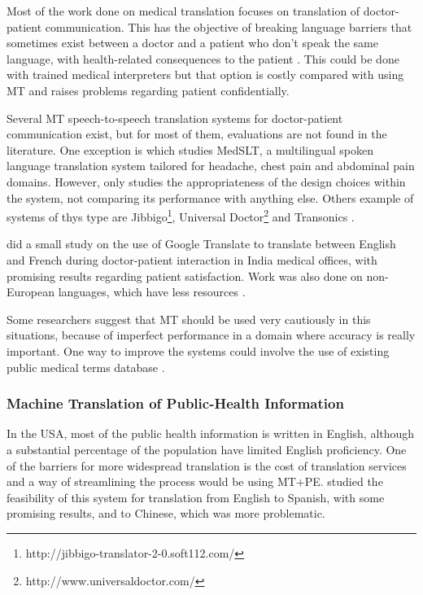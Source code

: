 Most of the work done on medical translation focuses on translation of doctor-patient communication. This has the objective of breaking language barriers that sometimes exist between a doctor and a patient who don't speak the same language, with health-related consequences to the patient \citep{Schyve2007}. This could be done with trained medical interpreters but that option is costly compared with using MT and raises problems regarding patient confidentially. 

Several MT speech-to-speech translation systems for doctor-patient communication exist, but for most of them, evaluations are not found in the literature. One exception is \citep{Bouillon2005} which studies MedSLT, a multilingual spoken language translation system tailored for headache, chest pain and abdominal pain domains. However, \citep{Bouillon2005} only studies the appropriateness of the design choices within the system, not comparing its performance with anything else. Others example of systems of thys type are Jibbigo\footnote{http://jibbigo-translator-2-0.soft112.com/}, Universal Doctor\footnote{http://www.universaldoctor.com/} and Transonics \citep{Nagata2005}.

\citep{Kaliyadan2010} did a small study on the use of Google Translate to translate between English and French during doctor-patient interaction in India medical offices, with promising results regarding patient satisfaction. Work was also done on non-European languages, which have less resources \citep{Musleh2016, Kathol2005}.

Some researchers \citep{G2013, Conference2012} suggest that MT should be used very cautiously in this situations, because of imperfect performance in a domain where accuracy is really important. One way to improve the systems could involve the use of existing public medical terms database \citep{Eck2004}.

\subsubsection{Machine Translation of Public-Health Information}

In the USA, most of the public health information is written in English, although a substantial percentage of the population have limited English proficiency. One of the barriers for more widespread translation is the cost of translation services and a way of streamlining the process would be using MT+PE. \citep{Kirchhoff2011, Turner2015} studied the feasibility of this system for translation from English to Spanish, with some promising results, and to Chinese, which was more problematic. 


